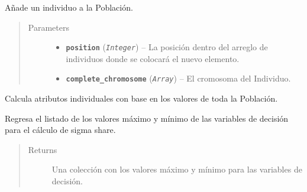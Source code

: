 \documentclass[letterpaper,10pt,english]{sphinxmanual}
\begin{document}
\begin{fulllineitems}
\begin{fulllineitems}
\label{Model/Community/Population/Population:Model.Community.Population.Population.Population.add_individual}
Añade un individuo a la Población.
\begin{quote}\begin{description}
\item[{Parameters}] \leavevmode\begin{itemize}
\item {} 
\textbf{\texttt{position}} (\emph{\texttt{Integer}}) -- La posición dentro del arreglo de individuos 
donde se colocará el nuevo elemento.

\item {} 
\textbf{\texttt{complete\_chromosome}} (\emph{\texttt{Array}}) -- El cromosoma del Individuo.

\end{itemize}

\end{description}\end{quote}

\end{fulllineitems}


\begin{fulllineitems}
\label{Model/Community/Population/Population:Model.Community.Population.Population.Population.calculate_population_properties}
Calcula atributos individuales con base en los valores de toda la Población.

\end{fulllineitems}


\begin{fulllineitems}
\label{Model/Community/Population/Population:Model.Community.Population.Population.Population.get_decision_variables_extreme_values}
Regresa el listado de los valores máximo y mínimo de las 
variables de decisión para el cálculo de sigma share.
\begin{quote}\begin{description}
\item[{Returns}] \leavevmode
Una colección con los valores máximo y mínimo para las
variables de decisión.


\end{description}
\end{quote}
\end{fulllineitems}
\end{fulllineitems}
\end{document}

